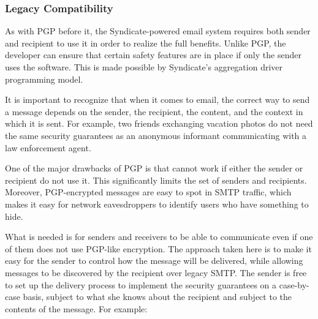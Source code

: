 \subsubsection{Legacy Compatibility}

As with PGP before it, the Syndicate-powered email system requires both sender
and recipient to use it in order to realize the full benefits.  Unlike PGP, the
developer can ensure that certain safety features are in place if only the
sender uses the software.  This is made possible by Syndicate's
aggregation driver programming model.

It is important to recognize that when it comes to email, the correct way to
send a message depends on the sender, the recipient, the content, and the context in which
it is sent.  For example, two friends exchanging vacation photos do not need the same
security guarantees as an anonymous informant communicating with a law
enforcement agent.

One of the major drawbacks of PGP is that cannot work if either the
sender or recipient do not use it.  This significantly limits the set of senders
and recipients.  Moreover, PGP-encrypted messages are easy to spot in SMTP
traffic, which makes it easy for network eavesdroppers to identify users who
have something to hide.

What is needed is for senders and receivers to be able to communicate even if
one of them does not use PGP-like encryption.  The approach taken here is to
make it easy for the sender to control how the message will be delivered, while
allowing messages to be discovered by the recipient over legacy SMTP.  The
sender is free to set up the delivery process to implement the security
guarantees on a case-by-case basis, subject to what she knows about the recipient and subject to
the contents of the message.  For example:

